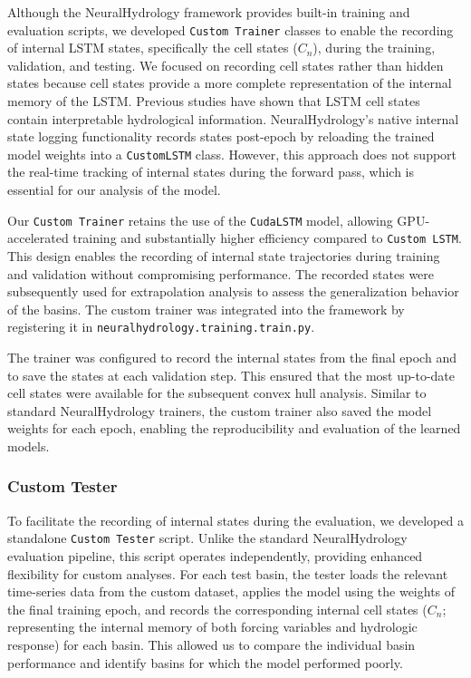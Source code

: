 \documentclass{article}
\begin{document}
Although the NeuralHydrology framework \cite{Kratzert2022open} provides built-in training and evaluation scripts, we developed \texttt{Custom Trainer} classes to enable the recording of internal LSTM states, specifically the cell states ($C_n$), during the training, validation, and testing. We focused on recording cell states rather than hidden states because cell states provide a more complete representation of the internal memory of the LSTM. Previous studies have shown that LSTM cell states contain interpretable hydrological information\cite{Lees2021}. NeuralHydrology's native internal state logging functionality records states post-epoch by reloading the trained model weights into a \texttt{CustomLSTM} class. However, this approach does not support the real-time tracking of internal states during the forward pass, which is essential for our analysis of the model.

Our \texttt{Custom Trainer} retains the use of the \texttt{CudaLSTM} model, allowing GPU-accelerated training and substantially higher efficiency compared to \texttt{Custom LSTM}. This design enables the recording of internal state trajectories during training and validation without compromising performance. The recorded states were subsequently used for extrapolation analysis to assess the generalization behavior of the basins. The custom trainer was integrated into the framework by registering it in \texttt{neuralhydrology.training.train.py}.

The trainer was configured to record the internal states from the final epoch and to save the states at each validation step. This ensured that the most up-to-date cell states were available for the subsequent convex hull analysis. Similar to standard NeuralHydrology trainers, the custom trainer also saved the model weights for each epoch, enabling the reproducibility and evaluation of the learned models.

\subsubsection{Custom Tester}

To facilitate the recording of internal states during the evaluation, we developed a standalone \texttt{Custom Tester} script. Unlike the standard NeuralHydrology evaluation pipeline, this script operates independently, providing enhanced flexibility for custom analyses. For each test basin, the tester loads the relevant time-series data from the custom dataset, applies the model using the weights of the final training epoch, and records the corresponding internal cell states ($C_n$; representing the internal memory of both forcing variables and hydrologic response) for each basin. This allowed us to compare the individual basin performance and identify basins for which the model performed poorly.
\end{document}
